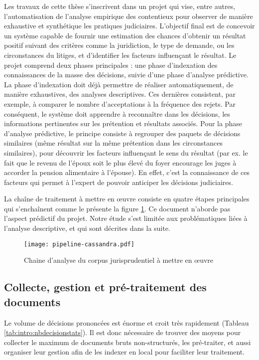 Les travaux de cette thèse s'inscrivent dans un projet qui vise, entre autres, l'automatisation de l'analyse empirique des contentieux pour observer de manière exhaustive et synthétique les pratiques judiciaires. L'objectif final est de concevoir un système capable de fournir une estimation des chances d'obtenir un résultat positif suivant des critères comme la juridiction, le type de demande, ou les circonstances du litiges, et d'identifier les facteurs influençant le résultat. Le projet comprend deux phases principales : une phase d'indexation des connaissances de la masse des décisions, suivie d'une phase d'analyse prédictive. La phase d'indexation doit déjà permettre de réaliser automatiquement, de manière exhaustives, des analyses descriptives. Ces dernières consistent, par exemple, à comparer le nombre d'acceptations à la fréquence des rejets. Par conséquent, le système doit apprendre à reconnaître dans les décisions, les informations pertinentes sur les prétention et résultats associés. Pour la phase d'analyse prédictive, le principe consiste à regrouper des paquets de décisions similaires (même résultat sur la même prétention dans les circonstances similaires), pour découvrir les facteurs influençant le sens du résultat (par ex. le fait que \og le revenu de l'époux soit le plus élevé du foyer\fg{} encourage les juges à accorder la pension alimentaire à l'épouse). En effet, c'est la connaissance de ces facteurs qui permet à l'expert de pouvoir anticiper les décisions judiciaires.

 La chaîne de traitement à mettre en \oe uvre consiste en quatre étapes principales qui s'enchaînent comme le présente la figure \ref{fig:intro:pipeline-globale}. Ce document n'aborde pas l'aspect prédictif du projet. Notre étude s'est limitée aux problématiques liées à l'analyse descriptive, et qui sont décrites dans la suite.
\begin{figure}
	\texttt{[image: pipeline-cassandra.pdf]}
	\caption{Chaine d'analyse du corpus jurisprudentiel à mettre en \oe uvre} \label{fig:intro:pipeline-globale}
\end{figure} 


\subsection{Collecte, gestion et pré-traitement des documents}

 Le volume de décisions prononcées est énorme et croit très rapidement (Tableau \ref{tab:intro:nbdecisionstats}). Il est donc nécessaire de trouver des moyens pour collecter le maximum de documents bruts non-structurés, les pré-traiter, et aussi organiser leur gestion afin de les indexer en local pour faciliter leur traitement.

